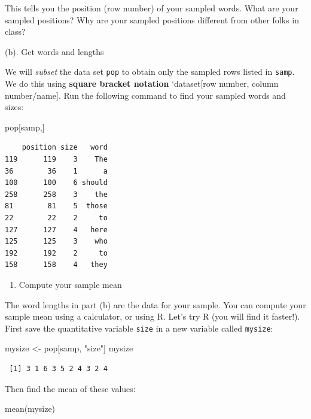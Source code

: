 \documentclass[
]{book}
\newenvironment{Shaded}{\begin{snugshade}}{\end{snugshade}}
\newcommand{\FunctionTok}[1]{\textcolor[rgb]{0.00,0.00,0.00}{#1}}
\newcommand{\NormalTok}[1]{#1}
\newcommand{\OtherTok}[1]{\textcolor[rgb]{0.56,0.35,0.01}{#1}}
\newcommand{\StringTok}[1]{\textcolor[rgb]{0.31,0.60,0.02}{#1}}
\providecommand{\tightlist}{%
  \setlength{\itemsep}{0pt}\setlength{\parskip}{0pt}}
\begin{document}
This tells you the position (row number) of your sampled words. What are your sampled positions? Why are your sampled positions different from other folks in class?

(b). Get words and lengths

We will \emph{subset} the data set \texttt{pop} to obtain only the sampled rows listed in \texttt{samp}. We do this using \textbf{square bracket notation} `dataset{[}row number, column number/name{]}. Run the following command to find your sampled words and sizes:

\begin{Shaded}
\begin{Highlighting}[]
\NormalTok{pop[samp,]}
\end{Highlighting}
\end{Shaded}

\begin{verbatim}
    position size   word
119      119    3    The
36        36    1      a
100      100    6 should
258      258    3    the
81        81    5  those
22        22    2     to
127      127    4   here
125      125    3    who
192      192    2     to
158      158    4   they
\end{verbatim}

\begin{enumerate}
\def\labelenumi{\alph{enumi}.}
\setcounter{enumi}{2}
\tightlist
\item
  Compute your sample mean
\end{enumerate}

The word lengths in part (b) are the data for your sample. You can compute your sample mean using a calculator, or using R. Let's try R (you will find it faster!). First save the quantitative variable \texttt{size} in a new variable called \texttt{mysize}:

\begin{Shaded}
\begin{Highlighting}[]
\NormalTok{mysize }\OtherTok{\textless{}{-}}\NormalTok{ pop[samp, }\StringTok{"size"}\NormalTok{]}
\NormalTok{mysize}
\end{Highlighting}
\end{Shaded}

\begin{verbatim}
 [1] 3 1 6 3 5 2 4 3 2 4
\end{verbatim}

Then find the mean of these values:

\begin{Shaded}
\begin{Highlighting}[]
\FunctionTok{mean}\NormalTok{(mysize)}
\end{Highlighting}
\end{Shaded}
\end{document}
